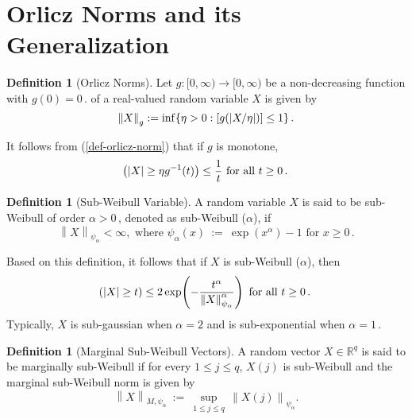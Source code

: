 \documentclass[12pt]{article}
\theoremstyle{plain}
\theoremstyle{definition}
\newtheorem{definition}[theorem]{Definition}
\theoremstyle{remark}
\let\Pr\relax
\newcommand*{\Pr}{\mathbb{P}}
\let\Ex\relax
\newcommand*{\Ex}{\mathbb{E}}
\providecommand{\norm}[1]{\left\lVert#1\right\rVert}
\begin{document}
\section{Orlicz Norms and its Generalization}
\begin{definition}[Orlicz Norms]
  Let $g:[0, \infty) \rightarrow [0, \infty)$ be a non-decreasing function
  with $g(0) = 0\,.$ of a real-valued random variable $X$ is given by
  \begin{equation}\label{def-orlicz-norm}
    \left\lVert X \right\rVert_g := \inf\{\eta > 0: \Ex\left[g(\vert X /\eta
    \vert) \right] \le 1\}\,.
  \end{equation}
\end{definition}

It follows from (\ref{def-orlicz-norm}) that if $g$ is monotone,
\begin{equation} \nonumber
  \Pr\!\left(\vert X \vert \ge \eta g^{-1}(t) \right) \le \dfrac{1}{t} \text{
  for all } t \ge 0\,.
\end{equation}

\begin{definition}[Sub-Weibull Variable]
  A random variable $X$ is said to be sub-Weibull of order $\alpha > 0\,$,
  denoted as sub-Weibull ($\alpha$), if
  \begin{equation} \label{def-sub-weibull}
    \norm{X}_{\psi_\alpha} < \infty, \text{ where } \psi_\alpha(x) ~:=~
    \exp\left(x^\alpha \right) - 1 \text{  for } x \ge 0\,.
  \end{equation}
\end{definition}
Based on this definition, it follows that if $X$ is sub-Weibull ($\alpha$), then
\begin{equation}\nonumber
  \Pr\!\left(\vert X \vert \ge t \right) \le 2 \exp\!\left(-
  \dfrac{t^\alpha}{\norm{X}^\alpha_{\psi_{\alpha}}} \right) \text{ for all } t
  \ge 0\,.
\end{equation}
Typically, $X$ is sub-gaussian when $\alpha = 2$ and is sub-exponential when $
\alpha = 1\,.$

\begin{definition}[Marginal Sub-Weibull Vectors]
  A random vector $X\in\mathbb{R}^q$ is said to be marginally sub-Weibull if for
  every $1\le j\le q$, $X(j)$ is sub-Weibull and the marginal sub-Weibull norm
  is given by
  \[
  \norm{X}_{M,\psi_{\alpha}} ~:=~ \sup_{1\le j\le q}\,\norm{X(j)}_{\psi_{\alpha}}.
  \]
\end{definition}
\end{document}
